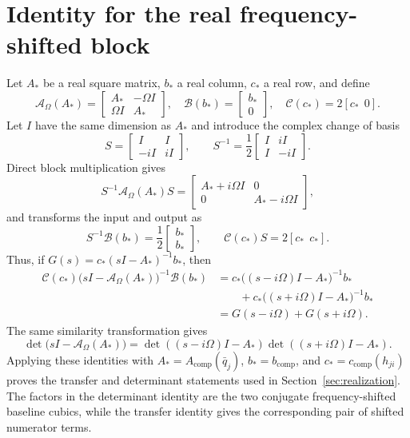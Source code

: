 \documentclass[final,5p,times,twocolumn]{elsarticle}
\begin{document}
\appendix

\section{Identity for the real frequency-shifted block}\label{app:direct-realization}

Let $A_*$ be a real square matrix, $b_*$ a real column, $c_*$ a real row, and define
\[
\mathcal A_\Omega(A_*)=
\begin{bmatrix}A_*&-\Omega I\\ \Omega I&A_*\end{bmatrix},
\quad
\mathcal B(b_*)=\begin{bmatrix}b_*\\0\end{bmatrix},
\quad
\mathcal C(c_*)=2[c_*\ \ 0].
\]
Let $I$ have the same dimension as $A_*$ and introduce the complex change of basis
\[
S=
\begin{bmatrix}
I&I\\
-iI&iI
\end{bmatrix},
\qquad
S^{-1}=\frac12
\begin{bmatrix}
I&iI\\
I&-iI
\end{bmatrix}.
\]
Direct block multiplication gives
\[
S^{-1}\mathcal A_\Omega(A_*)S
=
\begin{bmatrix}
A_*+i\Omega I&0\\
0&A_*-i\Omega I
\end{bmatrix},
\]
and transforms the input and output as
\[
S^{-1}\mathcal B(b_*)=
\frac12\begin{bmatrix}b_*\\b_*\end{bmatrix},
\qquad
\mathcal C(c_*)S=2[c_*\ \ c_*].
\]
Thus, if $G(s)=c_*(sI-A_*)^{-1}b_*$, then
\[
\begin{aligned}
\mathcal C(c_*)\bigl(sI-\mathcal A_\Omega(A_*)\bigr)^{-1}\mathcal B(b_*)
&=c_*\bigl((s-i\Omega)I-A_*\bigr)^{-1}b_*\\
&\qquad{}+c_*\bigl((s+i\Omega)I-A_*\bigr)^{-1}b_*\\
&=G(s-i\Omega)+G(s+i\Omega).
\end{aligned}
\]
The same similarity transformation gives
\[
\det\bigl(sI-\mathcal A_\Omega(A_*)\bigr)
=\det((s-i\Omega)I-A_*)\det((s+i\Omega)I-A_*).
\]
Applying these identities with $A_*=A_{\mathrm{comp}}(\bar q_j)$, $b_*=b_{\mathrm{comp}}$, and $c_*=c_{\mathrm{comp}}(h_{ji})$ proves the transfer and determinant statements used in Section~\ref{sec:realization}. The factors in the determinant identity are the two conjugate frequency-shifted baseline cubics, while the transfer identity gives the corresponding pair of shifted numerator terms.
\end{document}
